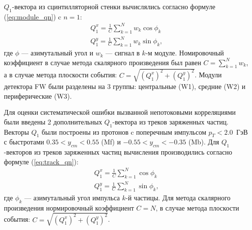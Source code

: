 $Q_1$-вектора из сцинтилляторной стенки вычислялись согласно формуле (\ref{eq:module_qn}) c $n=1$:
\begin{equation}
    \begin{align}
        Q_1^x = \frac{1}{C} \sum_{k=1}^N w_k \cos \phi_k \\
        Q_1^y = \frac{1}{C} \sum_{k=1}^N w_k \sin \phi_k,
    \end{align}
\end{equation}
где $\phi$ --- азимутальный угол и $w_k$ --- сигнал в $k$-м модуле. Номировочный коэффициент в случае метода скалярного произведения был равен $C=\sum_{k=1}^{N} w_k$, а в случае метода плоскости события: $C = \sqrt{(Q_1^x)^2 + (Q_1^y)^2}$.
Модули детектора FW были разделены на 3 группы: центральные (W1), средние (W2) и периферические (W3).

Для оценки систематической ошибки вызванной непотоковыми корреляциями были введены 2 дополнительных $Q_1$-вектора из треков заряженных частиц.
Векторы $Q_1$ были построены из протонов c поперечным импульсом $p_T < 2.0$~ГэВ с быстротами $0.35 < y_{cm} < 0.55$ (Mf) и $-0.55 < y_{cm} < -0.35$ (Mb).
Для $Q_1$-векторов из треков заряженных частиц вычисления производились согласно формуле (\ref{eq:track_qn}):
\begin{equation}
    \begin{align}
        Q_1^x = \frac{1}{C} \sum_{k=1}^N \cos \phi_k \\
        Q_1^y = \frac{1}{C} \sum_{k=1}^N \sin \phi_k,
    \end{align}
\end{equation}
где $\phi_k$ --- азимутальный угол импульса $k$-й частицы. Для метода скалярного произведения нормировочный коэффициент $C=N$, в случае метода плоскости события: $C = \sqrt{(Q_1^x)^2 + (Q_1^y)^2}$.


